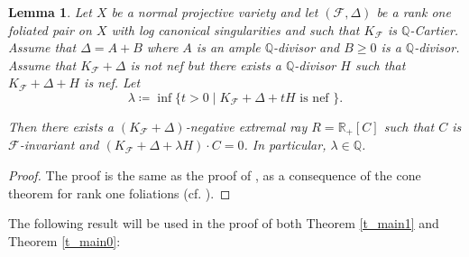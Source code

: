 \documentclass[12pt]{amsart}
\newtheorem{lemma}[theorem]{Lemma}
\newcommand{\bb}[1]{\mathbb{#1}}
\newcommand{\cal}[1]{\mathcal{#1}}
\begin{document}
\begin{lemma}\label{l_cone}
Let $X$ be a normal projective variety and let $(\cal F,\Delta)$ be a rank one  foliated  pair on $X$ with log canonical singularities and such that $K_{\cal F}$ is $\mathbb Q$-Cartier. Assume that  $\Delta=A+B$ where $A$ is an ample $\bb Q$-divisor and $B\ge 0$ is a $\bb Q$-divisor. Assume that $K_{\cal F}+\Delta$ is not nef but there exists a $\bb Q$-divisor $H$ such that $K_{\cal F}+\Delta+H$ is nef. 
Let 
\[
\lambda \coloneq \inf\{t>0\mid K_{\cal F}+\Delta+tH\text{ is nef }\}.
\]

Then there exists a $(K_{\cal F}+\Delta)$-negative extremal ray $R=\mathbb R_+[C]$ such that 
$C$ is $\cal F$-invariant and 
$(K_{\cal F}+\Delta+\lambda H)\cdot C=0$. In particular, $\lambda\in \mathbb Q$. 
\end{lemma}
\begin{proof}
The proof is the same as the proof of  \cite[Lemma 9.2]{CS21}, as a consequence of the cone theorem for rank one foliations (cf. \cite[Theorem 1.2] {CS23b}).
\end{proof}

The following result will be used  in the proof of both Theorem \ref{t_main1} and Theorem \ref{t_main0}: 
\end{document}
